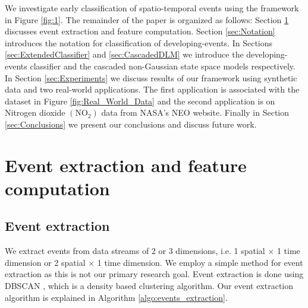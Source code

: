 \documentclass[a4paper,11pt]{article}
\begin{document}
We investigate early classification of spatio-temporal events using the framework in Figure \ref{fig:1}. The remainder of the paper is organized as follows: Section \ref{sec:EventExtract} discusses event extraction and feature computation. Section \ref{sec:Notation} introduces the notation for classification of developing-events. In Sections \ref{sec:ExtendedClassifier} and \ref{sec:CascadedDLM} we introduce the developing-events classifier and the cascaded non-Gaussian state space models respectively. %
In Section \ref{sec:Experiments} we discuss results of our framework using synthetic data and two real-world applications. The first application is associated with the dataset in Figure \ref{fig:Real_World_Data} and the second application is on Nitrogen dioxide $(\text{NO}_2)$ data from NASA's NEO \cite{OMINO2} website. Finally in Section \ref{sec:Conclusions} we present our conclusions and discuss future work.

\section{Event extraction and feature computation} \label{sec:EventExtract}

\subsection{Event extraction}

We extract events from data streams of 2 or 3 dimensions, i.e. 1 spatial $ \times $ 1 time dimension or 2 spatial $ \times $ 1 time dimension. We employ a simple method for event extraction as this is not our primary research goal. Event extraction is done using DBSCAN \cite{ester1996density}, which is a density based clustering algorithm. Our event extraction algorithm is explained in Algorithm \ref{algo:events_extraction}.
\end{document}
